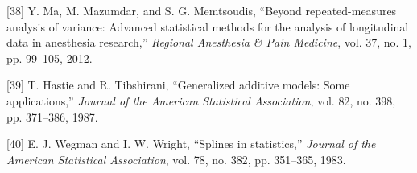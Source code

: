\documentclass[
]{article}
\begin{document}
\leavevmode\hypertarget{ref-ma2012}{}%
{[}38{]} Y. Ma, M. Mazumdar, and S. G. Memtsoudis, ``Beyond repeated-measures analysis of variance: Advanced statistical methods for the analysis of longitudinal data in anesthesia research,'' \emph{Regional Anesthesia \& Pain Medicine}, vol. 37, no. 1, pp. 99--105, 2012.

\leavevmode\hypertarget{ref-hastie1987}{}%
{[}39{]} T. Hastie and R. Tibshirani, ``Generalized additive models: Some applications,'' \emph{Journal of the American Statistical Association}, vol. 82, no. 398, pp. 371--386, 1987.

\leavevmode\hypertarget{ref-wegman1983}{}%
{[}40{]} E. J. Wegman and I. W. Wright, ``Splines in statistics,'' \emph{Journal of the American Statistical Association}, vol. 78, no. 382, pp. 351--365, 1983.
\end{document}
